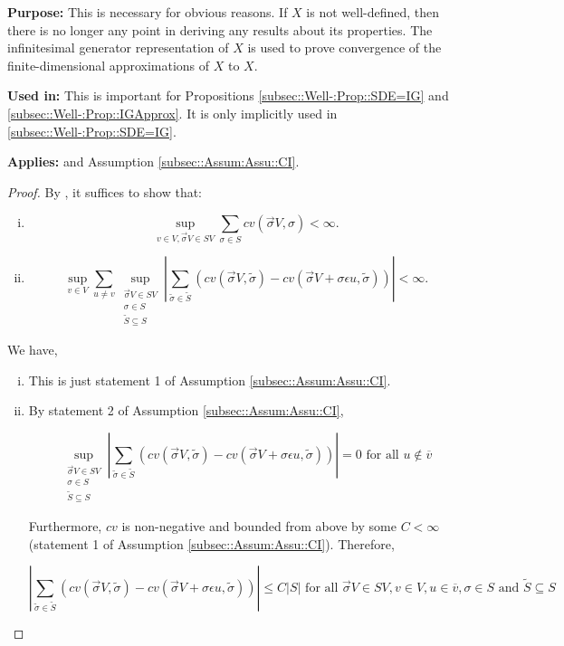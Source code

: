 \documentclass[12pt]{article}
\newcommand{\ov}{\overline}
\newcommand{\te}{\text}
\newcommand{\ep}{\epsilon}
\newcommand{\purpose}{\textbf{Purpose: }}
\newcommand{\usein}{\textbf{Used in: }}
\newcommand{\app}{\textbf{Applies: }}
\renewcommand{\v}{v}							%
\newcommand{\vv}{u}								%
\renewcommand{\S}{S}							%
\newcommand{\s}{\sigma}							%
\newcommand{\sv}{\vec{\s}}						%
\newcommand{\ev}{\ep}							%
\newcommand{\X}{X}								%
\newcommand{\IGr}{c}							%
\newcommand{\cl}{\ov}							%
\newcommand{\const}{C}							%
\renewcommand{\ss}{\tilde{\s}}					%
\renewcommand{\SS}{\tilde{\S}}					%
\begin{document}
\purpose This is necessary for obvious reasons. If \(\X{}{}\) is not well-defined, then there is no longer any point in deriving any results about its properties. The infinitesimal generator representation of \(\X{}{}\) is used to prove convergence of the finite-dimensional approximations of \(\X{}{}\) to \(\X{}{}\).

\usein This is important for Propositions \ref{subsec::Well-:Prop::SDE=IG} and \ref{subsec::Well-:Prop::IGApprox}. It is only implicitly used in \ref{subsec::Well-:Prop::SDE=IG}.

\app \cite[Theorem 3.9]{Lig85} and Assumption \ref{subsec::Assum:Assu::CI}.

\begin{proof}
By \cite[Theorem 3.9 (a) and (b)]{Lig85}, it suffices to show that:

\begin{enumerate}[i)]
\item 

\[\sup_{\v \in V,\sv{}{V} \in \S{V}} \sum_{\s \in \S} \IGr{\v}(\sv{}{V},\s) < \infty.\]

\item 

\[\sup_{\v\in V}\sum_{\vv\neq \v} \sup_{\substack{\sv{}{V} \in \S{V}\\ \s\in \S\\ \SS \subseteq \S}} \left|\sum_{\ss \in \SS} (\IGr{\v}(\sv{}{V},\ss) - \IGr{\v}(\sv{}{V}+\s \ev{\vv},\ss))\right| < \infty.\]
\end{enumerate}

We have,

\begin{enumerate}[i)]
\item This is just statement 1 of Assumption \ref{subsec::Assum:Assu::CI}.

\item By statement 2 of Assumption \ref{subsec::Assum:Assu::CI}, 

\[\sup_{\substack{\sv{}{V} \in \S{V}\\ \s\in \S\\ \SS\subseteq \S}} \left|\sum_{\ss \in \SS} (\IGr{\v}(\sv{}{V},\ss) - \IGr{\v}(\sv{}{V}+\s \ev{\vv},\ss))\right| = 0 \te{ for all } \vv \notin \cl{\v}\]

Furthermore, \(\IGr{\v}\) is non-negative and bounded from above by some \(\const{} < \infty\) (statement 1 of Assumption \ref{subsec::Assum:Assu::CI}). Therefore, 

\[\left|\sum_{\ss \in \SS} (\IGr{\v}(\sv{}{V},\ss) - \IGr{\v}(\sv{}{V}+\s\ev{\vv},\ss))\right| \leq \const{}|\S| \te{ for all } \sv{}{V} \in \S{V},\v \in V, \vv \in \cl{\v}, \s \in \S \te{ and } \SS\subseteq \S\]


\end{enumerate}
\end{proof}
\end{document}
